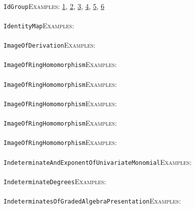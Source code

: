 \documentclass[a4paper,11pt]{report}
\begin{document}
{{ \\
 \texttt{IdGroup}{\nobreakspace}{\nobreakspace}{\nobreakspace}{\nobreakspace}\textsc{Examples:} \href{tutorial/chap5.html} {1}{\nobreakspace}, \href{../www/SideLinks/About/aboutBogomolov.html} {2}{\nobreakspace}, \href{../www/SideLinks/About/aboutPersistent.html} {3}{\nobreakspace}, \href{../www/SideLinks/About/aboutQuandles.html} {4}{\nobreakspace}, \href{../www/SideLinks/About/aboutquasi.html} {5}{\nobreakspace}, \href{../www/SideLinks/About/aboutGouter.html} {6}{\nobreakspace} \\
 \\
 \texttt{IdentityMap}{\nobreakspace}{\nobreakspace}{\nobreakspace}{\nobreakspace}\textsc{Examples:} \\
 \\
 \texttt{ImageOfDerivation}{\nobreakspace}{\nobreakspace}{\nobreakspace}{\nobreakspace}\textsc{Examples:} \\
 \\
 \texttt{ImageOfRingHomomorphism}{\nobreakspace}{\nobreakspace}{\nobreakspace}{\nobreakspace}\textsc{Examples:} \\
 \\
 \texttt{ImageOfRingHomomorphism}{\nobreakspace}{\nobreakspace}{\nobreakspace}{\nobreakspace}\textsc{Examples:} \\
 \\
 \texttt{ImageOfRingHomomorphism}{\nobreakspace}{\nobreakspace}{\nobreakspace}{\nobreakspace}\textsc{Examples:} \\
 \\
 \texttt{ImageOfRingHomomorphism}{\nobreakspace}{\nobreakspace}{\nobreakspace}{\nobreakspace}\textsc{Examples:} \\
 \\
 \texttt{ImageOfRingHomomorphism}{\nobreakspace}{\nobreakspace}{\nobreakspace}{\nobreakspace}\textsc{Examples:} \\
 \\
 \texttt{IndeterminateAndExponentOfUnivariateMonomial}{\nobreakspace}{\nobreakspace}{\nobreakspace}{\nobreakspace}\textsc{Examples:} \\
 \\
 \texttt{IndeterminateDegrees}{\nobreakspace}{\nobreakspace}{\nobreakspace}{\nobreakspace}\textsc{Examples:} \\
 \\
 \texttt{IndeterminatesOfGradedAlgebraPresentation}{\nobreakspace}{\nobreakspace}{\nobreakspace}{\nobreakspace}\textsc{Examples:} \\
 \\
}}
\end{document}
